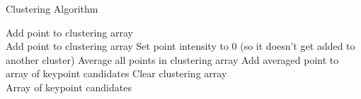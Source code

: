 \begin{algorithm}[H]
\caption{Clustering Algorithm}
\label{alg:cluster}
\begin{algorithmic}[1]
\begin{raggedright}
\State Add point to clustering array
\\
\State Add point to clustering array
\State Set point intensity to 0 (so it doesn't get added to another cluster)
\EndIf
\EndFor
\State Average all points in clustering array
\State Add averaged point to array of keypoint candidates
\State Clear clustering array
\EndIf
\EndFor
\EndFunction\\
\Return Array of keypoint candidates
\end{raggedright}
\end{algorithmic}
\end{algorithm}
